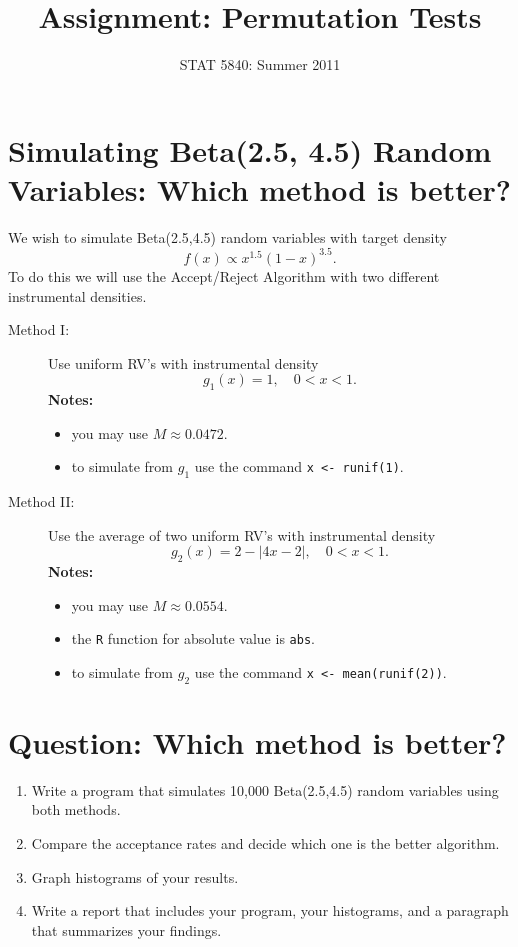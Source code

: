 \documentclass[11pt,english]{article}
\title{Assignment: Permutation Tests}
\date{STAT 5840: Summer 2011}
\begin{document}
\maketitle

\thispagestyle{empty}

\section*{Simulating Beta(2.5, 4.5) Random Variables: Which method is better?}
\label{sec-1}

We wish to simulate Beta(2.5,4.5) random variables with target density
\[
f(x) \propto x^{1.5}(1-x)^{3.5}.
\]
To do this we will use the Accept/Reject Algorithm with two different instrumental densities.


\begin{description}
\item[Method I:] Use uniform RV’s with instrumental density
   \[
   g_{1}(x) = 1,\quad 0 < x < 1.
   \]
   \textbf{Notes:}
\begin{itemize}
\item you may use \(M \approx 0.0472\).
\item to simulate from \(g_{1}\) use the command \texttt{x <- runif(1)}.
\end{itemize}
\item[Method II:] Use the average of two uniform RV’s with instrumental density
   \[
   g_{2}(x) = 2 - |4x - 2|,\quad 0 < x <1.
   \]
   \textbf{Notes:}
\begin{itemize}
\item you may use \(M \approx 0.0554\).
\item the \texttt{R} function for absolute value is \texttt{abs}.
\item to simulate from \(g_{2}\) use the command \texttt{x <- mean(runif(2))}.
\end{itemize}
\end{description}
\section*{Question: Which method is better?}
\label{sec-2}


\begin{enumerate}
\item Write a program that simulates 10,000 Beta(2.5,4.5) random variables using both methods.
\item Compare the acceptance rates and decide which one is the better algorithm.
\item Graph histograms of your results.
\item Write a report that includes your program, your histograms, and a paragraph that summarizes your findings.
\end{enumerate}
\end{document}
